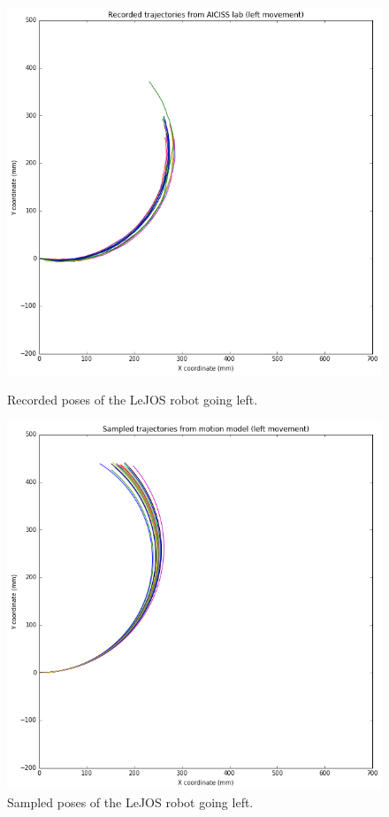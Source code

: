 \documentclass[paper=a4, fontsize=11pt]{scrartcl} %
\begin{document}
	\begin{figure}[h!]
		\centering
		\begin{minipage}{0.45\textwidth}
			\centering
			\includegraphics[width=1\textwidth]{images/recorded_poses_left.png} %
			\caption{Recorded poses of the LeJOS robot going left.}
		\end{minipage}\hfill
		\begin{minipage}{0.45\textwidth}
			\centering
			\includegraphics[width=1\textwidth]{images/sampled_poses_left.png} %
			\caption{Sampled poses of the LeJOS robot going left.}
		\end{minipage}
	\end{figure}
\end{document}
